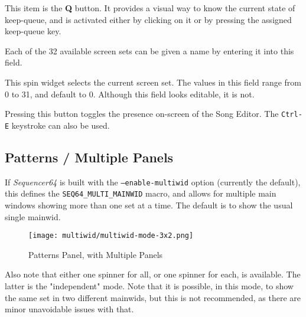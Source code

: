    This item is the \textbf{Q} button.
   It provides a visual way to know the current state of keep-queue, and is
   activated either by clicking on it or by pressing the assigned keep-queue
   key.

   Each of the 32 available screen sets can be given a name by entering it
   into this field.

%

   This spin widget selects the current screen set.  The values in this
   field range from 0 to 31, and default to 0.
   Although this field looks editable, it is not.

%

   Pressing this button toggles the presence on-screen of the Song
   Editor.  The \texttt{Ctrl-E} keystroke can also be used.

\subsection{Patterns / Multiple Panels}
\label{subsec:seq64_patterns_panel_multiple}

   If \textsl{Sequencer64} is built with the \texttt{--enable-multiwid}
   option (currently the default), this defines the 
   \texttt{SEQ64\_MULTI\_MAINWID} macro, and allows for
    multiple main windows showing more than one set at a time.
   The default is to show the usual single mainwid.

\begin{figure}[H]
   \centering 
   \texttt{[image: multiwid/multiwid-mode-3x2.png]}
   \caption{Patterns Panel, with Multiple Panels}
   \label{fig:pattern_window_bottom_panel_multiple}
\end{figure}

   Also note that either one spinner for all, or one spinner for each, is
   available.  The latter is the "independent" mode.
   Note that it is possible, in this mode, to show the same set in two
   different mainwids, but this is not recommended, as there are minor
   unavoidable issues with that.

